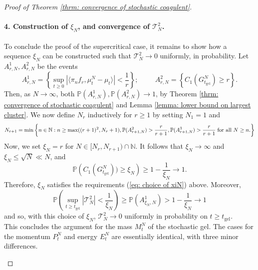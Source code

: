 \begin{proof}[Proof of Theorem \ref{thrm: convergence of stochastic coagulent}]
       \paragraph{4. Construction of $\xi_N$, and convergence of $\mathcal{T}^2_N$.} To conclude the proof of the supercritical case, it remains to show how a sequence $\xi_N$ can be constructed such that $\mathcal{T}^2_N \rightarrow 0$ uniformly, in probability. Let $A^1_{r,N}, A^2_{r,N}$ be the events \begin{equation} \label{eq: definition of A1rn}
       A^1_{r,N}=\left\{\sup_{t\geq 0} |\langle \pi_n f_r, \mu^N_t-\mu_t\rangle|<\frac{1}{r}\right\}; \hspace{1cm}
       A^2_{r,N}=\left\{C_1(G^N_{t_\text{gel}}) \geq r\right\}.
   \end{equation} Then, as $N\rightarrow \infty$, both $\mathbb{P}(A^1_{r,N}), \mathbb{P}(A^2_{r,N}) \rightarrow 1$, by Theorem \ref{thrm: convergence of stochastic coagulent} and Lemma \ref{lemma: lower bound on largest cluster}. We now define $N_r$ inductively for $r\geq 1$ by setting $N_1=1$ and \begin{equation}
       \label{eq: recursive definition of Nr} N_{r+1}=\min\left\{n \in \mathbb{N}: n\geq \max((r+1)^2, N_r+1),  \mathbb{P}(A^2_{r+1,N})>\frac{r}{r+1},  \mathbb{P}(A^3_{r+1,N})>\frac{r}{r+1} \hspace{0.1cm} \text{for all }N\geq n. \right\}
   \end{equation} Now, we set $\xi_N=r$ for $N\in [N_r, N_{r+1})\cap\mathbb{N}.$ It follows that $\xi_N \rightarrow \infty$ and $\xi_N\leq \sqrt{N}\ll N$, and \begin{equation}
       \mathbb{P}\left(C_1(G^N_{t_\text{gel}}))\geq \xi_N\right)\ge 1-\frac{1}{\xi_N} \rightarrow 1. 
   \end{equation} Therefore, $\xi_N$ satisfies the requirements (\ref{eq: choice of xiN}) above. Moreover, \begin{equation}
       \mathbb{P}\left(\sup_{t\geq t_\text{gel}} |\mathcal{T}^2_N| <\frac{1}{\xi_N}\right) \ge \mathbb{P}\left(A^1_{\xi_N,N}\right) > 1-\frac{1}{\xi_N}\rightarrow 1
   \end{equation} and so, with this choice of $\xi_N$, $\mathcal{T}^2_N \rightarrow 0$ uniformly in probability on $t\ge t_\text{gel}.$ \bigskip \\ This concludes the argument for the mass $M^N_t$ of the stochastic gel. The cases for the momentum $P^N_t$ and energy $E^N_t$ are essentially identical, with three minor differences. \begin{enumerate}[label=\roman{*}).]

\end{enumerate}
\end{proof}

